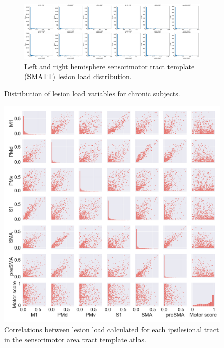 \documentclass[10pt]{article}
\begin{document}
\begin{figure}
\begin{subfigure}{1\textwidth}
  \centering
  \includegraphics[width=1\linewidth]{figures/all2h_lesionload.png}
  \caption{Left and right hemisphere sensorimotor tract template (SMATT) lesion load distribution.}
  \label{fig:sfig2}
\end{subfigure}
\caption{Distribution of lesion load variables for chronic subjects.}
\label{lesion_load_dist}
\end{figure}


\begin{figure}[ht]
\centering
\includegraphics[width=0.8\linewidth]{figures/SMATT_scatterplts.png}
\caption{Correlations between lesion load calculated for each ipsilesional tract in the sensorimotor area tract template atlas.}
\label{smatt_pairwise_correlations}
\end{figure}
\end{document}
